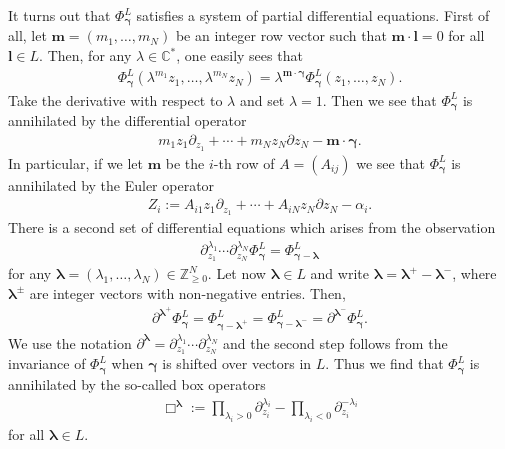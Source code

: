 It turns out that $\Phi_{\bm{\gamma}}^L$ satisfies a system of partial differential equations. First of all, let $\bm{m}=
(m_1,\dots,m_N)$ be an integer row vector such that $\bm{m}\cdot\bm{l}=0$ for all $\bm{l}\in L$.
Then, for any $\lambda \in \mathbb{C}^*$, one easily sees that
\begin{gather*}
\Phi_{\bm{\gamma}}^L(\lambda^{m_1}z_1,\dots,\lambda^{m_N}z_N)=
\lambda^{\bm{m}\cdot\bm{\gamma}}\Phi_{\bm{\gamma}}^L(z_1,\dots,z_N).
\end{gather*}
Take the derivative with respect to $\lambda$ and set $\lambda=1$. Then we see that
$\Phi_{\bm{\gamma}}^L$ is annihilated by the differential operator
\begin{gather*}
m_1z_1\partial_{z_1}+\cdots+m_Nz_N\partial{z_N}-\bm{m}\cdot\bm{\gamma}.
\end{gather*}
In particular, if we let $\bm{m}$ be the $i$-th row of $A=(A_{ij})$ we see
that $\Phi_{\bm{\gamma}}^L$ is annihilated by the Euler operator
\begin{gather*}
Z_i:=A_{i1}z_1\partial_{z_1}+\cdots+A_{iN}z_N\partial{z_N}-\alpha_i.
\end{gather*}
There is a second set of differential equations which arises from the
observation
\begin{gather*}
\partial_{z_1}^{\lambda_1}\cdots\partial_{z_N}^{\lambda_N}\Phi_{\bm{\gamma}}^L
=\Phi_{\bm{\gamma}-\bm{\lambda}}^L
\end{gather*}
for any $\bm{\lambda}=(\lambda_1,\dots,\lambda_N)\in\mathbb{Z}_{\ge0}^N$.
Let now $\bm{\lambda}\in L$ and write $\bm{\lambda}=\bm{\lambda}^+-\bm{\lambda}^-$,
where $\bm{\lambda}^\pm$ are integer vectors with non-negative entries. Then,
\begin{gather*}
\partial^{\bm{\lambda}^+}\Phi_{\bm{\gamma}}^L
=\Phi_{\bm{\gamma}-\bm{\lambda}^+}^L=\Phi_{\bm{\gamma}-\bm{\lambda}^-}^L
=\partial^{\bm{\lambda}^-}\Phi_{\bm{\gamma}}^L.
\end{gather*}
We use the notation $\partial^{\bm{\lambda}}=\partial_{z_1}^{\lambda_1}
\cdots\partial_{z_N}^{\lambda_N}$ and the second step follows from the invariance
of $\Phi_{\bm{\gamma}}^L$ when $\bm{\gamma}$ is shifted over vectors in $L$.
Thus we find that $\Phi_{\bm{\gamma}}^L$ is annihilated by the so-called box operators
\begin{gather*}
\Box^{\bm \lambda}:=\prod_{\lambda_i>0}\partial_{z_i}^{\lambda_i}-\prod_{\lambda_i<0}
\partial_{z_i}^{-\lambda_i}
\end{gather*}
for all $\bm{\lambda}\in L$.

